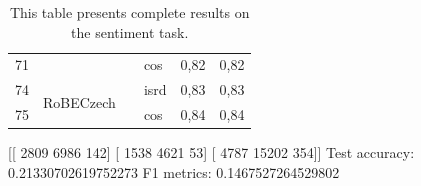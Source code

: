 \begin{table}[]
{\begin{tabular}{|l|l|l|l||ll|}
71 &                            &                           & cos                   & 0,82   & 0,82 \\ \cline{1-2} \cline{4-6} 
74 & \multirow{2}{*}{RoBECzech} &                           & isrd                  & 0,83   & 0,83 \\ \cline{1-1} \cline{4-6} 
75 &                            &                           & cos                   & 0,84   & 0,84 \\ \hline
\end{tabular}}
\caption{This table presents complete results on the sentiment task. }
\label{tab:res_all_sent}
\end{table}







%




[[ 2809  6986   142]
 [ 1538  4621    53]
 [ 4787 15202   354]]
Test accuracy: 0.21330702619752273
F1 metrics: 0.1467527264529802
















